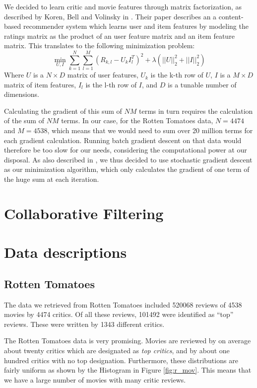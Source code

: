 \documentclass[12pt]{article}
\begin{document}
	We decided to learn critic and movie features through matrix factorization, as described by Koren, Bell and Volinsky in \cite{Koren09}. Their paper describes an a content-based recommender system which learns user and item features by modeling the ratings matrix as the product of an user feature matrix and an item feature matrix. This translates to the following minimization problem:
	$$ \min_{U,I} \sum_{k = 1}^{N} \sum_{l = 1}^{M} (R_{k,l} - U_k I_l^T)^2 + \lambda (||U||_2^2 + ||I||_2^2) $$
	Where $U$ is a $N \times D$ matrix of user features, $U_k$ is the k-th row of $U$, $I$ is a $M \times D$ matrix of item features, $I_l$ is the l-th row of $I$, and $D$ is a tunable number of dimensions.

	Calculating the gradient of this sum of $NM$ terms in turn requires the calculation of the sum of $NM$ terms. In our case, for the Rotten Tomatoes data, $N = 4474$ and $M = 4538$, which means that we would need to sum over 20 million terms for each gradient calculation. Running batch gradient descent on that data would therefore be too slow for our needs, considering the computational power at our disposal. As also described in \cite{Koren09}, we thus decided to use stochastic gradient descent as our minimization algorithm, which only calculates the gradient of one term of the huge sum at each iteration.


\section{Collaborative Filtering}

\section{Data descriptions}

\subsection{Rotten Tomatoes}

	The data we retrieved from Rotten Tomatoes included 520068 reviews of 4538 movies by 4474 critics. Of all these reviews, 101492 were identified as ``top'' reviews. These were written by 1343 different critics.

	The Rotten Tomatoes data is very promising. Movies are reviewed by on average about twenty critics which are designated as \textit{top critics}, and by about one hundred critics with no top designation. Furthermore, these distributions are fairly uniform as shown by the Histogram in Figure \ref{fig:r_mov}. This means that we have a large number of movies with many critic reviews.
\end{document}
